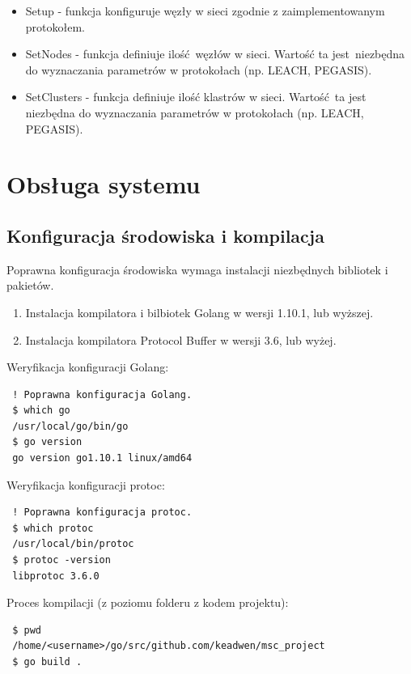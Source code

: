 \documentclass[a4paper,12pt,twoside,openany]{report}
\begin{document}
\begin{itemize}
 \item Setup - funkcja konfiguruje węzły w sieci zgodnie z zaimplementowanym protokołem.
 \item SetNodes - funkcja definiuje ilość węzłów w sieci. Wartość ta jest niezbędna do wyznaczania parametrów w protokołach (np. LEACH, PEGASIS).
 \item SetClusters - funkcja definiuje ilość klastrów w sieci. Wartość ta jest niezbędna do wyznaczania parametrów w protokołach (np. LEACH, PEGASIS).
\end{itemize}

\section{Obsługa systemu}
 
\subsection{Konfiguracja środowiska i kompilacja}

Poprawna konfiguracja środowiska wymaga instalacji niezbędnych bibliotek i pakietów.

\begin{enumerate}
 \item Instalacja kompilatora i bilbiotek Golang w wersji 1.10.1, lub wyższej.
 \item Instalacja kompilatora Protocol Buffer w wersji 3.6, lub wyżej.
\end{enumerate}

Weryfikacja konfiguracji Golang:

\begin{lstlisting}
 ! Poprawna konfiguracja Golang.
 $ which go
 /usr/local/go/bin/go
 $ go version
 go version go1.10.1 linux/amd64
\end{lstlisting}

Weryfikacja konfiguracji protoc:

\begin{lstlisting}
 ! Poprawna konfiguracja protoc.
 $ which protoc
 /usr/local/bin/protoc
 $ protoc -version
 libprotoc 3.6.0
\end{lstlisting}

Proces kompilacji (z poziomu folderu z kodem projektu):

\begin{lstlisting}
 $ pwd
 /home/<username>/go/src/github.com/keadwen/msc_project
 $ go build .
\end{lstlisting}
\end{document}
